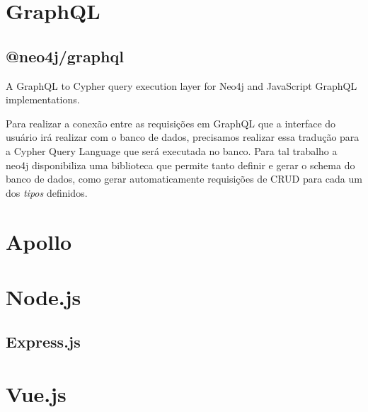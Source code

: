 \section{GraphQL}


\subsection{@neo4j/graphql}
A GraphQL to Cypher query execution layer for Neo4j and JavaScript GraphQL implementations.

Para realizar a conexão entre as requisições em GraphQL que a interface do usuário irá realizar com o banco de dados, precisamos realizar essa tradução para a Cypher Query Language que será executada no banco. Para tal trabalho a neo4j disponibiliza uma biblioteca que permite tanto definir e gerar o schema do banco de dados, como gerar automaticamente requisições de CRUD para cada um dos \textit{tipos} definidos.

\section{Apollo}

\section{Node.js}

\subsection{Express.js}

\section{Vue.js}
